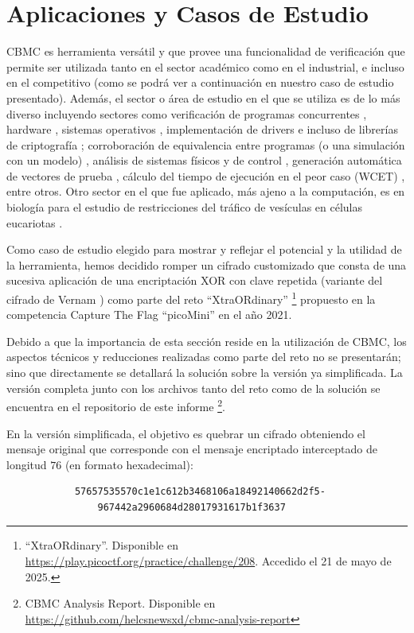 \documentclass[runningheads]{llncs}
\begin{document}
%
\section{Aplicaciones y Casos de Estudio}
CBMC es herramienta versátil y que provee una funcionalidad de verificación que permite ser utilizada tanto en el sector académico como en el industrial, e incluso
en el competitivo (como se podrá ver a continuación en nuestro caso de estudio presentado).
Además, el sector o área de estudio en el que se utiliza es de lo más diverso incluyendo sectores como verificación de programas concurrentes \cite{cbmc-concurrent}, 
hardware \cite{cbmc-hardware-case}, sistemas operativos \cite{cbmc-tinyos-case}, implementación de drivers \cite{cbmc-drivers-case} e incluso de
librerías de criptografía \cite{cbmc-ecc-case,cbmc-prng-case}; corroboración de equivalencia entre programas (o una simulación con un modelo) 
\cite{cbmc-equiv-code-generators-case,cbmc-equiv-stateflow-case}, análisis de sistemas físicos y de control \cite{cbmc-vehicles-case}, generación automática de vectores 
de prueba \cite{cbmc-testing-case1,cbmc-testing-case2}, cálculo del tiempo de ejecución en el peor caso (WCET) \cite{cbmc-wcet-case}, entre otros.
Otro sector en el que fue aplicado, más ajeno a la computación, es en biología para el estudio de restricciones del tráfico de vesículas en células eucariotas \cite{cbmc-biology-case}.

Como caso de estudio elegido para mostrar y reflejar el potencial y la utilidad de la herramienta, hemos decidido romper un cifrado customizado que consta 
de una sucesiva aplicación de una encriptación XOR con clave repetida (variante del cifrado de Vernam \cite{crypto-book}) como parte 
del reto ``XtraORdinary'' \footnote{``XtraORdinary''. Disponible en \url{https://play.picoctf.org/practice/challenge/208}. Accedido el 21 de mayo de 2025.}
propuesto en la competencia Capture The Flag ``picoMini'' en el año 2021.

Debido a que la importancia de esta sección reside en la utilización de CBMC, los aspectos técnicos y reducciones realizadas como parte del reto no se presentarán; 
sino que directamente se detallará la solución sobre la versión ya simplificada.
La versión completa junto con los archivos tanto del reto como de la solución se encuentra en el repositorio de este informe
\footnote{CBMC Analysis Report. Disponible en \url{https://github.com/helcsnewsxd/cbmc-analysis-report}}.

En la versión simplificada, el objetivo es quebrar un cifrado obteniendo el mensaje original que corresponde con el mensaje encriptado interceptado
de longitud $76$ (en formato hexadecimal):
\begin{verbatim}
            57657535570c1e1c612b3468106a18492140662d2f5-
                967442a2960684d28017931617b1f3637
\end{verbatim}
\end{document}
